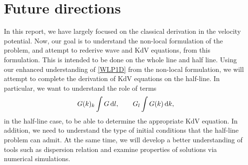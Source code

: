 \documentclass[10pt,reqno,oneside,a4paper]{article}
\begin{document}
\section{Future directions}
In this report, we have largely focused on the classical derivation in the velocity potential. Now, our goal is to understand the non-local formulation of the problem, and attempt to rederive wave and KdV equations, from this formulation. This is intended to be done on the whole line and half line. Using our enhanced understanding of \eqref{WLP1D} from the non-local formulation, we will attempt to complete the derivation of KdV equations on the half-line. In particular, we want to understand the role of terms 
\[ G(k)_k \int G \,\mathrm{d} l,  \qquad G_l \int G(k) \,\mathrm{d} k, \]
in the half-line case, to be able to determine the appropriate KdV equation. In addition, we need to understand the type of initial conditions that the half-line problem can admit. At the same time, we will develop a better understanding of tools such as dispersion relation and examine properties of solutions via numerical simulations. 
\end{document}
